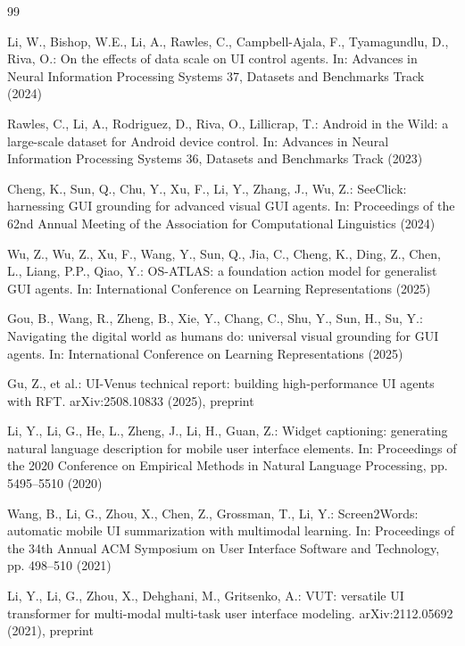 \documentclass[runningheads,a4paper]{llncs}
\begin{document}
\begin{thebibliography}{99}

Li, W., Bishop, W.E., Li, A., Rawles, C., Campbell-Ajala, F., Tyamagundlu, D., Riva, O.:
On the effects of data scale on UI control agents. In: Advances in Neural Information Processing
Systems 37, Datasets and Benchmarks Track (2024)

Rawles, C., Li, A., Rodriguez, D., Riva, O., Lillicrap, T.: Android in the Wild: a large-scale
dataset for Android device control. In: Advances in Neural Information Processing Systems 36,
Datasets and Benchmarks Track (2023)

Cheng, K., Sun, Q., Chu, Y., Xu, F., Li, Y., Zhang, J., Wu, Z.: SeeClick: harnessing GUI
grounding for advanced visual GUI agents. In: Proceedings of the 62nd Annual Meeting of the
Association for Computational Linguistics (2024)

Wu, Z., Wu, Z., Xu, F., Wang, Y., Sun, Q., Jia, C., Cheng, K., Ding, Z., Chen, L., Liang, P.P.,
Qiao, Y.: OS-ATLAS: a foundation action model for generalist GUI agents. In: International
Conference on Learning Representations (2025)

Gou, B., Wang, R., Zheng, B., Xie, Y., Chang, C., Shu, Y., Sun, H., Su, Y.: Navigating the
digital world as humans do: universal visual grounding for GUI agents. In: International
Conference on Learning Representations (2025)

Gu, Z., et al.: UI-Venus technical report: building high-performance UI agents with RFT.
arXiv:2508.10833 (2025), preprint

Li, Y., Li, G., He, L., Zheng, J., Li, H., Guan, Z.: Widget captioning: generating natural
language description for mobile user interface elements. In: Proceedings of the 2020 Conference
on Empirical Methods in Natural Language Processing, pp. 5495--5510 (2020)

Wang, B., Li, G., Zhou, X., Chen, Z., Grossman, T., Li, Y.: Screen2Words: automatic mobile UI
summarization with multimodal learning. In: Proceedings of the 34th Annual ACM Symposium on User
Interface Software and Technology, pp. 498--510 (2021)

Li, Y., Li, G., Zhou, X., Dehghani, M., Gritsenko, A.: VUT: versatile UI transformer for
multi-modal multi-task user interface modeling. arXiv:2112.05692 (2021), preprint


\end{thebibliography}
\end{document}
